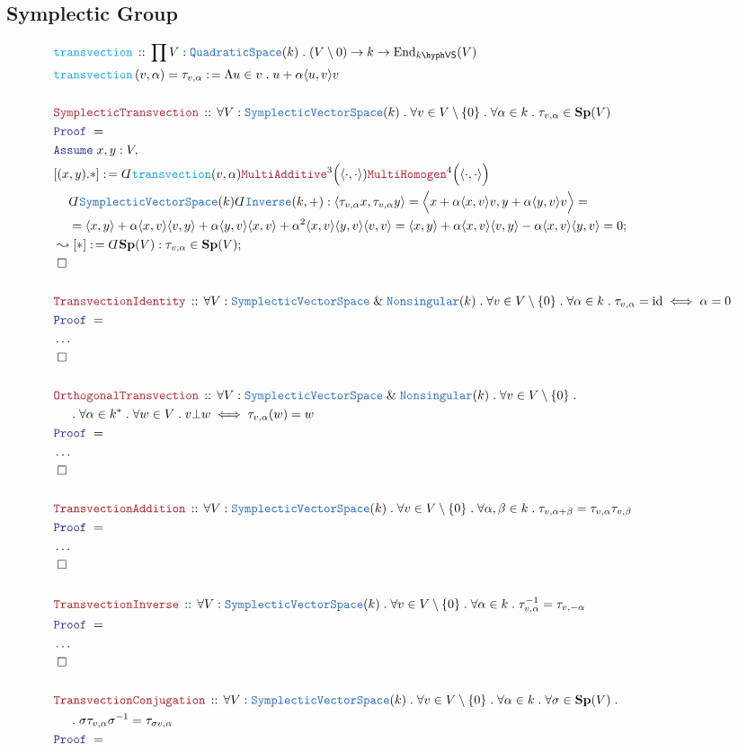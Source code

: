 \documentclass[12pt]{scrartcl}%
\newcommand{\TYPE}[1]{\textcolor{NavyBlue}{\mathtt{#1}}}%
\newcommand{\FUNC}[1]{\textcolor{Cerulean}{\mathtt{#1}}}%
\newcommand{\LOGIC}[1]{\textcolor{Blue}{\mathtt{#1}}}%
\newcommand{\THM}[1]{\textcolor{Maroon}{\mathtt{#1}}}%
\renewcommand{\.}{\; . \;} %
\newcommand{\de}{: \kern 0.1pc =} %
\newcommand{\Act}[1]{\left( #1 \right)} %
\newcommand{\Theorem}[2]{& \THM{#1} \, :: \, #2 \\ & \Proof = \\ } %
\newcommand{\DeclareFunc}[2]{& \FUNC{#1} \, :: \, #2 \\}%
\newcommand{\DefineNamedFunc}[4]{&  \FUNC{#1}\Act{#2} = #3 \de #4 \\}%
\newcommand{\NewLine}{\\ & \kern 1pc}%
\newcommand{\Page}[1]{ \begin{align*} #1 \end{align*}  }%
\newcommand{ \bd }{ \ByDef }%
\newcommand{\NoProof}{ & \ldots \\ \EndProof}%
\renewcommand{\And}{\; \& \;}%
\DeclareMathOperator*{\id}{id}%
\newcommand{\End}{\mathrm{End}}%
\newcommand{\Conclude}[3]{& #1 \de #2 : #3; \\}%
\newcommand{\DeriveConclude}[3]{& \leadsto #1 \de #2 : #3 ; \\} %
\newcommand{\Assume}[2]{& \LOGIC{Assume} \; #1 : #2, \\} %
\newcommand{\QED}{\; \square} %
\newcommand{\EndProof}{& \QED \\} %
\newcommand{\ByDef}{\rotatebox[origin=c]{-180}{$D$}}%
\newcommand{\Proof}{\LOGIC{Proof} \; } %
\newcommand{\SVS}{\TYPE{SymplecticVectorSpace}}
\newcommand{\Sp}{\mathbf{Sp}}
\newcommand{\VS}[1]{#1\hyph\mathsf{VS}} %
\begin{document}
\subsection{Symplectic Group}
\Page{
	\DeclareFunc{transvection}{\prod V : \TYPE{QuadraticSpace}(k) \. (V \setminus 0) \to k \to \End_{\VS{k}}(V) }
	\DefineNamedFunc{transvection}{v,\alpha}{\tau_{v,\alpha}}{\Lambda u \in v \. u + \alpha \langle u,v \rangle v}
	\\
	\Theorem{SymplecticTransvection}{\forall V : \SVS(k) \. \forall v \in V \setminus \{0\} \. \forall \alpha \in k \. \tau_{v,\alpha} \in \Sp(V) }
	\Assume{x,y}{V}
	\Conclude{[(x,y).*]}{ \bd \FUNC{transvection}(v,\alpha)\THM{MultiAdditive}^3\Big(\langle \cdot,\cdot \rangle)\THM{MultiHomogen}^4\Big(\langle \cdot,\cdot \rangle\Big) \NewLine \bd \SVS(k) \bd \TYPE{Inverse}(k,+)}  
	{
		\langle \tau_{v,\alpha}x, \tau_{v,\alpha}y \rangle =
		\Big\langle x + \alpha \langle x, v \rangle v,  y + \alpha \langle y, v \rangle v \Big \rangle = \NewLine =
		\langle x, y \rangle + \alpha \langle x,v \rangle \langle v, y \rangle + \alpha \langle y, v \rangle \langle x, v \rangle  + \alpha^2 \langle x, v \rangle \langle y,v \rangle \langle v, v \rangle = 
		\langle x,y \rangle  + \alpha \langle x,v \rangle \langle v, y \rangle - \alpha \langle x,v \rangle \langle y, v \rangle = 0
	}
	\DeriveConclude{[*]}{\bd \Sp(V)}{\tau_{v,\alpha} \in \Sp(V)}
	\EndProof
	\\
	\Theorem{TransvectionIdentity}{\forall V : \SVS \And \TYPE{Nonsingular}(k) \. \forall v \in V \setminus \{0\} \. \forall \alpha \in k \. \tau_{v,\alpha} = \id \iff \alpha = 0 }
	\NoProof
	\\
	\Theorem{OrthogonalTransvection}{\forall V : \SVS \And \TYPE{Nonsingular}(k) \. \forall v \in V \setminus \{0\} \. \NewLine \. \forall \alpha \in k^* \. \forall w \in V \. v \bot w \iff \tau_{v,\alpha}(w) = w  }
	\NoProof
	\\
	\Theorem{TransvectionAddition}{\forall V : \SVS(k)  \. \forall v \in V \setminus \{0\} \. \forall \alpha,\beta \in k \.  \tau_{v,\alpha + \beta} = \tau_{v,\alpha}\tau_{v,\beta} }
	\NoProof
	\\
	\Theorem{TransvectionInverse}{\forall V : \SVS(k)  \. \forall v \in V \setminus \{0\} \. \forall \alpha \in k \.  \tau_{v,\alpha}^{-1} = \tau_{v,-\alpha} }
	\NoProof
	\\
	\Theorem{TransvectionConjugation}{\forall V : \SVS(k) \. \forall v \in V \setminus \{0\} \. \forall \alpha \in k \. \forall \sigma \in \Sp(V) \. 
		\NewLine \. \sigma \tau_{v,\alpha} \sigma^{-1} = \tau_{\sigma v, \alpha} }
}
\end{document}
